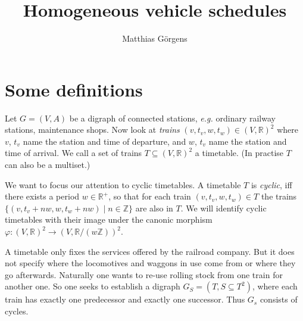 \documentclass{amsart} %
\def\eg{\emph{e.g.}}
\begin{document}
\author{Matthias Görgens}
\title{Homogeneous vehicle schedules}




\maketitle
\section{Some definitions}

Let \(G=(V,A)\) be a digraph of connected stations, \eg{} ordinary
railway stations, maintenance shops.  Now look at \label{trains}
\textit{trains} \((v, t_v, w, t_w) \in \left(V,\mathbb{R}\right)^2 \)
where \(v\), \(t_v\) name the station and time of departure, and
\(w\), \(t_v\) name the station and time of arrival.  We call a set of
trains \(T \subseteq \left(V,\mathbb{R}\right)^2\) a timetable.  (In
practise \(T\) can also be a multiset.)

We want to focus our attention to cyclic timetables.  A timetable \(T\)
is \label{cyclic} \textit{cyclic}, iff there exists a period \(w \in
\mathbb{R}^+\), so that for each train \((v, t_v, w, t_w) \in T\)
the trains \(\{(v, t_v+n w, w, t_w +n w) \mid n \in \mathbb{Z}\}\)
are also in \(T\).  We will identify cyclic timetables with their
image under the canonic morphism
\(\varphi \colon \left(V,\mathbb{R}\right)^2
\to \left(V,\mathbb{R}/{\left(w \mathbb{Z}\right)}\right)^2\).


A timetable only fixes the services offered by the railroad company.
But it does not specify where the locomotives and waggons in use come
from or where they go afterwards.  Naturally one wants to re-use
rolling stock from one train for another one.  So one seeks to
establish a digraph \(G_S=(T,S\subseteq T^2)\), where each train has
exactly one predecessor and exactly one successor.  Thus \(G_s\)
consists of cycles.
\end{document}

